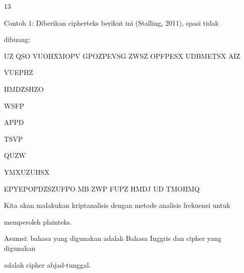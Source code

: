 \documentclass{article}
\begin{document}

13

Contoh 1: Diberikan cipherteks berikut ini (Stalling, 2011), spasi tidak 

dibuang:

 UZ QSO VUOHXMOPV GPOZPEVSG ZWSZ OPFPESX UDBMETSX AIZ 

VUEPHZ 

HMDZSHZO 

WSFP 

APPD 

TSVP 

QUZW 

YMXUZUHSX 

EPYEPOPDZSZUFPO MB ZWP FUPZ HMDJ UD TMOHMQ

 Kita akan malakukan kriptanalisis dengan metode analisis frekuensi untuk 

memperoleh plainteks. 

   Asumsi: bahasa yang digunakan adalah Bahasa Inggris dan cipher yang digunakan 

adalah cipher abjad-tunggal.
\end{document}
